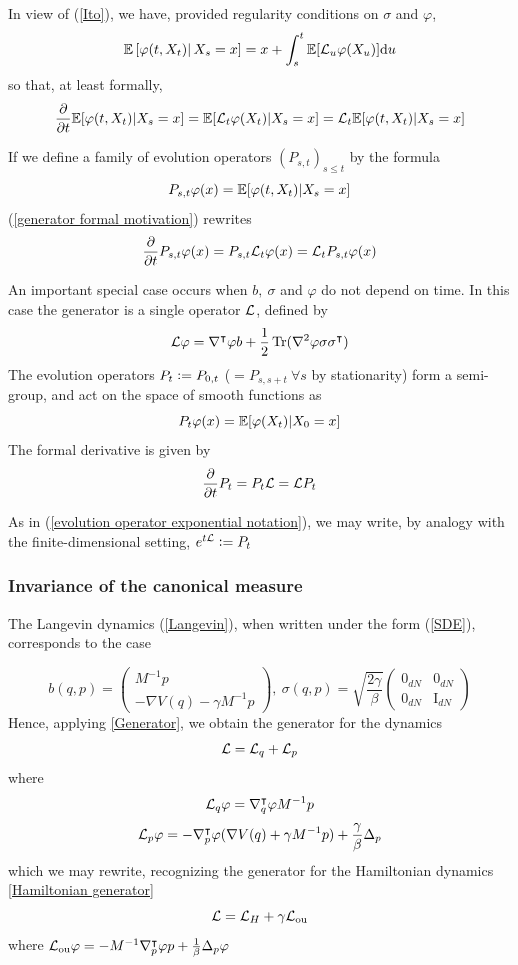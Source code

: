     In view of (\ref{Ito}), we have, provided regularity conditions on $\sigma$ and $\varphi$,
    $$\mathbb{E}\left[\varphi(t,X_t)\right|X_s=x]=x+\int_s^t \mathbb{E}[\mathcal{L}_u\varphi(X_u)] \text du$$
    so that, at least formally,
    \begin{equation}
    \label{generator formal motivation}
    \frac{\partial}{\partial t}\mathbb{E}[\varphi(t,X_t) | X_{s}=x]=\mathbb{E}[\mathcal{L}_{t} \varphi(X_{t})|X_{s}=x]=\mathcal{L}_{t}\mathbb{E}[\varphi(t,X_{t})|X_{s}=x]
    \end{equation}

    If we define a family of evolution operators $(P_{s,t})_{s\leq t}$ by the formula
    $$P_{s,t} \varphi (x)= \mathbb{E}[ \varphi (t,X_t) | X_s=x] $$
    (\ref{generator formal motivation}) rewrites
    $$ \frac{\partial}{\partial t} P_{s,t} \varphi (x)=P_{s,t}\mathcal{L}_t\varphi(x)=\mathcal{L}_t P_{s,t}\varphi(x)$$
    
    An important special case occurs when $b,\ \sigma$ and $\varphi$ do not depend on time. In this case the generator is a single operator $\mathcal{L}$, defined by
    $$\mathcal{L} \varphi = \nabla^\intercal \varphi b + \frac12 \operatorname{Tr}(\nabla^2 \varphi \sigma \sigma ^\intercal)$$ 
    The evolution operators $P_t \mathrel{\mathop:}= P_{0,t}$ ($ = P_{s,s+t}\ \forall s$ by stationarity) form a semi-group, and act on the space of smooth functions as
    $$ P_t \varphi(x)= \mathbb{E}[\varphi(X_t)| X_0=x]$$
    The formal derivative is given by
    $$ \frac{\partial}{\partial t}P_t=P_t\mathcal{L}=\mathcal{L} P_t$$
    
    As in (\ref{evolution operator exponential notation}), we may write, by analogy with the finite-dimensional setting,
    $e^{t\mathcal{L}}\mathrel{\mathop:}= P_t$


    \subsubsection{Invariance of the canonical measure}

    The Langevin dynamics (\ref{Langevin}), when written under the form (\ref{SDE}), corresponds to the case 

    $$ b(q,p)= \begin{pmatrix} M^{-1}p \\ -
    \nabla V(q)-\gamma M^{-1}p\end{pmatrix},\ \sigma(q,p)= \sqrt{\frac{2\gamma}\beta}\begin{pmatrix} 0_{dN} &  0_{dN} \\  0_{dN} & \text{I}_{dN} \end{pmatrix}$$
    Hence, applying \ref{Generator}, we obtain the generator for the dynamics
    $$ \mathcal{L}=  \mathcal{L}_q + \mathcal{L}_p $$
    where
    $$ \mathcal{L}_q \varphi= \nabla^\intercal_q\varphi M^{-1}p$$
    $$ \mathcal{L}_p\varphi =-\nabla^\intercal_{p}\varphi (\nabla V(q)+\gamma M^{-1}p) +\frac{\gamma}{\beta}\Delta_p $$
    which we may rewrite, recognizing the generator for the Hamiltonian dynamics \ref{Hamiltonian generator}
    $$ \mathcal{L}=\mathcal{L}_{H}+\gamma \mathcal{L}_{\text{ou}}$$
    where $\mathcal{L}_{\text{ou}}\varphi =-M^{-1}\nabla^\intercal_p\varphi p + \frac1{\beta}\Delta_p\varphi$

